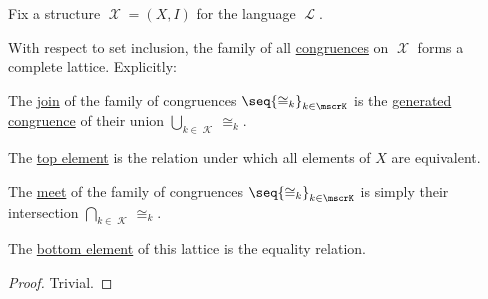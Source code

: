 \begin{proposition}\label{thm:congruences_form_complete_lattice}
  Fix a structure \( \mscrX = (X, I) \) for the language \( \mscrL \).

  With respect to set inclusion, the family of all \hyperref[def:first_order_congruence]{congruences} on \( \mscrX \) forms a complete lattice. Explicitly:
  \begin{thmenum}
     The \hyperref[def:lattice/join]{join} of the family of congruences \( \seq{ {\cong_k} }_{k \in \mscrK} \) is the \hyperref[def:first_order_generated_congruence]{generated congruence} of their union \( \bigcup_{k \in \mscrK} {\cong_k} \).

     The \hyperref[def:extremal_points/top_and_bottom]{top element} is the relation under which all elements of \( X \) are equivalent.

     The \hyperref[def:lattice/meet]{meet} of the family of congruences \( \seq{ {\cong_k} }_{k \in \mscrK} \) is simply their intersection \( \bigcap_{k \in \mscrK} {\cong_k} \).

     The \hyperref[def:extremal_points/top_and_bottom]{bottom element} of this lattice is the equality relation.
  \end{thmenum}
\end{proposition}
\begin{proof}
  Trivial.
\end{proof}

